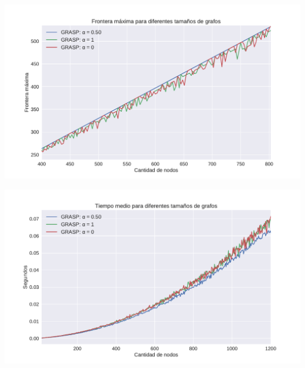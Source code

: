 {\centering
    \includegraphics[width=1\textwidth]{informe/imgs/exp_malo_frontera_grasp_zoom.pdf}
}

{\centering
    \includegraphics[width=1\textwidth]{informe/imgs/exp_malo_tiempo_grasp.pdf}
}